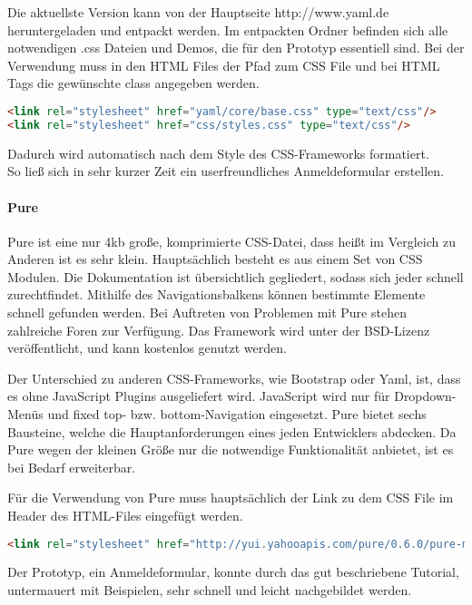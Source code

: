 Die aktuellste Version kann von der Hauptseite http://www.yaml.de heruntergeladen und entpackt werden. Im entpackten Ordner befinden sich alle notwendigen .css Dateien und Demos, die für den Prototyp essentiell sind. Bei der Verwendung muss in den HTML Files der Pfad zum CSS File und bei HTML Tags die gewünschte class angegeben werden. 
\begin{lstlisting}[caption={YAML einbinden \cite{YAMLPROTO}}, language=HTML]
<link rel="stylesheet" href="yaml/core/base.css" type="text/css"/>
<link rel="stylesheet" href="css/styles.css" type="text/css"/>
\end{lstlisting}

Dadurch wird automatisch nach dem Style des CSS-Frameworks formatiert.\\
So ließ sich in sehr kurzer Zeit ein userfreundliches Anmeldeformular erstellen.

\paragraph{Pure}
Pure ist eine nur 4kb große, komprimierte CSS-Datei, dass heißt im Vergleich zu Anderen ist es sehr klein. Hauptsächlich besteht es aus einem Set von CSS Modulen. Die Dokumentation ist übersichtlich gegliedert, sodass sich jeder schnell zurechtfindet. Mithilfe des Navigationsbalkens können bestimmte Elemente schnell gefunden werden. Bei Auftreten von Problemen mit Pure stehen zahlreiche Foren zur Verfügung. Das Framework wird unter der BSD-Lizenz veröffentlicht, und kann kostenlos genutzt werden.

Der Unterschied zu anderen CSS-Frameworks, wie Bootstrap oder Yaml, ist, dass es ohne JavaScript Plugins ausgeliefert wird. JavaScript wird nur für Dropdown-Menüs und fixed top- bzw. bottom-Navigation eingesetzt. Pure bietet sechs Bausteine, welche die Hauptanforderungen eines jeden Entwicklers abdecken. Da Pure wegen der kleinen Größe nur die notwendige Funktionalität anbietet, ist es bei Bedarf erweiterbar.

Für die Verwendung von Pure muss hauptsächlich der Link zu dem CSS File im Header des HTML-Files eingefügt werden. \cite{PURE}
\begin{lstlisting}[caption={Pure einbinden \cite{PURE}}, language=HTML]
<link rel="stylesheet" href="http://yui.yahooapis.com/pure/0.6.0/pure-min.css">
\end{lstlisting}

Der Prototyp, ein Anmeldeformular, konnte durch das gut beschriebene Tutorial, untermauert mit Beispielen, sehr schnell und leicht nachgebildet werden.

